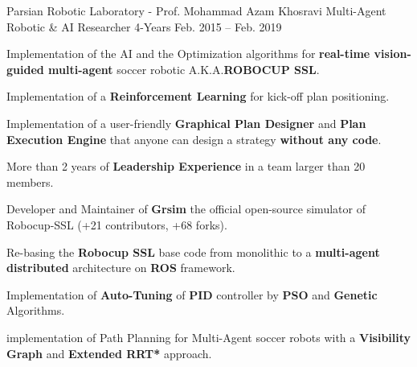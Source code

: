 

\begin{cventries}


  \cventry
    {Parsian Robotic Laboratory - Prof. Mohammad Azam Khosravi} %
    {Multi-Agent Robotic \& AI Researcher} %
    {4-Years} %
    {Feb. 2015 -- Feb. 2019} %
    {
      \begin{cvitems} %
        \item Implementation of the AI and the Optimization algorithms for \textbf{real-time vision-guided multi-agent} soccer robotic A.K.A.\textbf{ROBOCUP SSL}.
        \item Implementation of a \textbf{Reinforcement Learning} for kick-off plan positioning.
        \item Implementation of a user-friendly \textbf{Graphical Plan Designer} and \textbf{Plan Execution Engine} that anyone can design a strategy \textbf{without any code}.
        \item More than 2 years of \textbf{Leadership Experience} in a team larger than 20 members.
        \item Developer and Maintainer of \textbf{Grsim} the official open-source simulator of Robocup-SSL (+21 contributors, +68 forks).
        \item Re-basing the \textbf{Robocup SSL} base code from monolithic  to a \textbf{multi-agent distributed} architecture on \textbf{ROS} framework.
        \item Implementation of \textbf{Auto-Tuning} of \textbf{PID} controller by \textbf{PSO} and \textbf{Genetic} Algorithms.
        \item implementation of Path Planning for Multi-Agent soccer robots with a \textbf{Visibility Graph} and \textbf{Extended RRT*} approach.
      \end{cvitems}
    }




\end{cventries}
